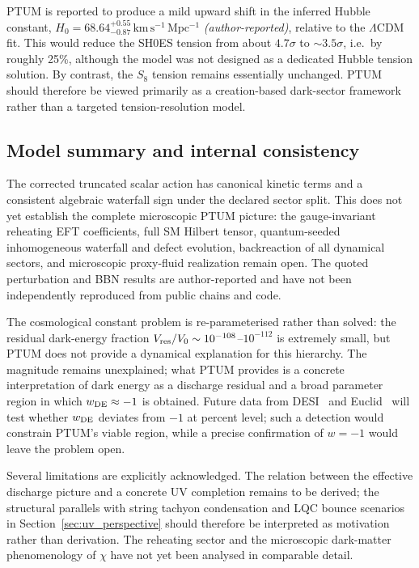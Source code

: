 \documentclass[epj]{svjour}
\begin{document}
PTUM is reported to produce a mild upward shift in the inferred Hubble
constant,
$H_0 = 68.64^{+0.55}_{-0.87}\,\mathrm{km\,s^{-1}\,Mpc^{-1}}$
\emph{(author-reported)},
relative to the $\Lambda$CDM fit. This would reduce the SH0ES tension
from about $4.7\sigma$ to $\sim3.5\sigma$, i.e.\ by roughly
25\%, although the model was not designed as a dedicated Hubble
tension solution. By contrast, the $S_8$ tension remains
essentially unchanged. PTUM should therefore be viewed primarily as
a creation-based dark-sector framework rather than a targeted
tension-resolution model.

\subsection{Model summary and internal consistency}
\label{sec:summary}

The corrected truncated scalar action has canonical kinetic
terms and a consistent algebraic waterfall sign under the declared
sector split. This does not yet establish the complete microscopic
PTUM picture: the gauge-invariant reheating EFT coefficients, full
SM Hilbert tensor, quantum-seeded inhomogeneous waterfall and defect
evolution, backreaction of all dynamical sectors, and microscopic
proxy-fluid realization remain open.
The quoted perturbation and BBN results are author-reported and have
not been independently reproduced from public chains and code.

The cosmological constant problem is re-parameterised rather than
solved: the residual dark-energy fraction
$V_{\rm res}/V_0\sim10^{-108}$--$10^{-112}$ is extremely small,
but PTUM does not provide a dynamical explanation for this hierarchy.
The magnitude remains unexplained; what PTUM provides is a concrete
interpretation of dark energy as a discharge residual and a broad parameter
region in which $w_{\rm DE}\approx-1$ is obtained.
Future data from DESI~\cite{DESI2024} and Euclid~\cite{Euclid2024}
will test whether $w_{\rm DE}$ deviates from $-1$ at percent level;
such a detection would constrain PTUM's viable region, while a
precise confirmation of $w=-1$ would leave the problem open.

Several limitations are explicitly acknowledged. The relation between
the effective discharge picture and a concrete UV completion remains
to be derived; the structural parallels with string tachyon
condensation and LQC bounce scenarios in Section~\ref{sec:uv_perspective}
should therefore be interpreted as motivation rather than derivation.
The reheating sector and the microscopic dark-matter phenomenology
of $\chi$ have not yet been analysed in comparable detail.
\end{document}
